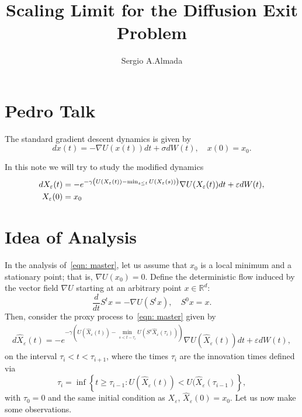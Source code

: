 \documentclass{amsproc}
\title{Scaling Limit for the Diffusion Exit Problem}
\author{Sergio A.Almada}
\newcommand{\R}{\mathbb{R}}
\newcommand{\eps}{\varepsilon}
\newcommand{\x}{X_\eps}
\newcommand{\hatx}{\hat X_\eps}
\begin{document}
\section{Pedro Talk}

The standard gradient descent dynamics is given by
\[
d x (t) = - \nabla U ( x(t) )dt + \sigma dW(t), \quad x(0) = x_0.
\]

In this note we will try to study the modified dynamics
\begin{align} \notag
d\x(t) &=  -e^{ -\gamma \left (  U(\x(t)) - \min_{s\leq t} U(\x(s))  \right ) } \nabla U ( \x(t) )dt + \eps dW(t), \\ 
\x(0)  &= x_0  \label{eqn: master}
\end{align}


\section{Idea of Analysis}
In the analysis of~\eqref{eqn: master}, let us assume that $x_0$ is a local minimum and a stationary point; that is, $\nabla U(x_0) = 0$. Define the deterministic flow induced by the vector field $\nabla U$ starting at an arbitrary point $x\in \R^d$:
\begin{equation} \label{eqn: master_zero_noise}
\frac{d}{dt} S^t x = -\nabla U ( S^t x), \quad S^0 x = x.
\end{equation}
Then, consider the proxy process to~\eqref{eqn: master} given by 
\begin{align} \label{eqn: hat}
d \hatx (t) =  -e^{ -\gamma \left (  U(\hatx(t)) - \min_{s < t - \tau_i} U(S^s \hatx(\tau_i))  \right ) } \nabla U ( \hatx(t) )dt + \eps dW(t), 
\end{align}
on the interval $\tau_i < t < \tau_{i+1}$, where the times $\tau_i$ are the innovation times defined via $$\tau_i = \inf \left\{  t \geq \tau_{i-1}: U( \hatx (t) ) < U( \hatx (\tau_{i-1})  \right \},$$ with $\tau_0 = 0$ and the same initial condition as $\x$, $\hatx (0) = x_0$. Let us now make some observations. 
\end{document}
